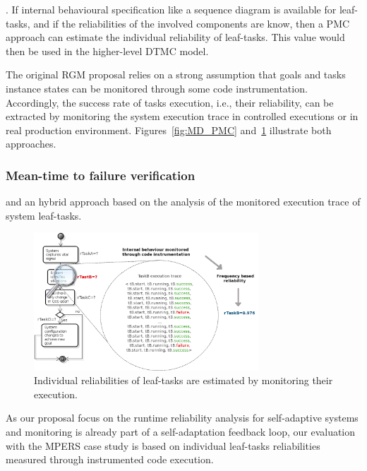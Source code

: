 . If internal behavioural specification like a sequence diagram is available for leaf-tasks, and if the reliabilities of the involved components are know, then a PMC approach can estimate the individual reliability of leaf-tasks. This value would then be used in the higher-level DTMC model. 

The original RGM proposal relies on a strong assumption that goals and tasks instance states can be monitored through some code instrumentation. Accordingly, the success rate of tasks execution, i.e., their reliability, can be extracted by monitoring the system execution trace in controlled executions or in real production environment. Figures~\ref{fig:MD_PMC} and~\ref{fig:MON_PMC} illustrate both approaches.

\subsubsection{Mean-time to failure verification}

and an hybrid approach based on the analysis of the monitored execution trace of system leaf-tasks.

\begin{figure}[ht!]
\centering
\includegraphics[width=0.75\textwidth]{imgs/MON_PMC.png}
\caption{Individual reliabilities of leaf-tasks are estimated by monitoring their execution.}
\label{fig:MON_PMC}
\end{figure}



As our proposal focus on the runtime reliability analysis for self-adaptive systems and monitoring is already part of a self-adaptation feedback loop, our evaluation with the MPERS case study is based on individual leaf-tasks reliabilities measured through instrumented code execution.

